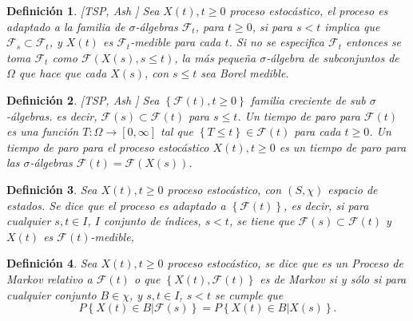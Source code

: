 \documentclass{article}
\newtheorem{Def}{Definición}[section]
\numberwithin{equation}{section}
\begin{document}
\begin{Def}\label{Def.Proc.Adaptado}[TSP, Ash \cite{RBA}]%
Sea $X\left(t\right),t\geq0$ proceso estoc\'astico, el proceso es adaptado a la familia de $\sigma$-\'algebras $\mathcal{F}_{t}$, para $t\geq0$, si para $s<t$ implica que $\mathcal{F}_{s}\subset\mathcal{F}_{t}$, y $X\left(t\right)$ es $\mathcal{F}_{t}$-medible para cada $t$. Si no se especifica $\mathcal{F}_{t}$ entonces se toma $\mathcal{F}_{t}$ como $\mathcal{F}\left(X\left(s\right),s\leq t\right)$, la m\'as peque\~na $\sigma$-\'algebra de subconjuntos de $\Omega$ que hace que cada $X\left(s\right)$, con $s\leq t$ sea Borel medible.
\end{Def}


\begin{Def}\label{Def.Tiempo.Paro}[TSP, Ash \cite{RBA}]
Sea $\left\{\mathcal{F}\left(t\right),t\geq0\right\}$ familia creciente de sub $\sigma$-\'algebras. es decir, $\mathcal{F}\left(s\right)\subset\mathcal{F}\left(t\right)$ para $s\leq t$. Un tiempo de paro para $\mathcal{F}\left(t\right)$ es una funci\'on $T:\Omega\rightarrow\left[0,\infty\right]$ tal que $\left\{T\leq t\right\}\in\mathcal{F}\left(t\right)$ para cada $t\geq0$. Un tiempo de paro para el proceso estoc\'astico $X\left(t\right),t\geq0$ es un tiempo de paro para las $\sigma$-\'algebras $\mathcal{F}\left(t\right)=\mathcal{F}\left(X\left(s\right)\right)$.
\end{Def}

\begin{Def}
Sea $X\left(t\right),t\geq0$ proceso estoc\'astico, con $\left(S,\chi\right)$ espacio de estados. Se dice que el proceso es adaptado a $\left\{\mathcal{F}\left(t\right)\right\}$, es decir, si para cualquier $s,t\in I$, $I$ conjunto de \'indices, $s<t$, se tiene que $\mathcal{F}\left(s\right)\subset\mathcal{F}\left(t\right)$ y $X\left(t\right)$ es $\mathcal{F}\left(t\right)$-medible,
\end{Def}

\begin{Def}
Sea $X\left(t\right),t\geq0$ proceso estoc\'astico, se dice que es un Proceso de Markov relativo a $\mathcal{F}\left(t\right)$ o que $\left\{X\left(t\right),\mathcal{F}\left(t\right)\right\}$ es de Markov si y s\'olo si para cualquier conjunto $B\in\chi$,  y $s,t\in I$, $s<t$ se cumple que
\begin{equation}\label{Prop.Markov}
P\left\{X\left(t\right)\in B|\mathcal{F}\left(s\right)\right\}=P\left\{X\left(t\right)\in B|X\left(s\right)\right\}.
\end{equation}
\end{Def}
\end{document}
